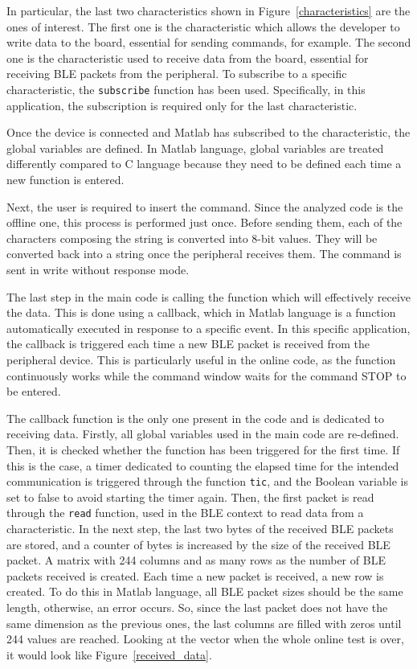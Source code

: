 \documentclass{Configuration_Files/PoliMi3i_thesis}
\begin{document}
In particular, the last two characteristics shown in Figure~\ref{characteristics} are the ones of interest. The first one is the characteristic which allows the developer to write data to the board, essential for sending commands, for example. The second one is the characteristic used to receive data from the board, essential for receiving BLE packets from the peripheral. To subscribe to a specific characteristic, the \texttt{subscribe} function has been used. Specifically, in this application, the subscription is required only for the last characteristic.

Once the device is connected and Matlab has subscribed to the characteristic, the global variables are defined. In Matlab language, global variables are treated differently compared to C language because they need to be defined each time a new function is entered.

Next, the user is required to insert the command. Since the analyzed code is the offline one, this process is performed just once. Before sending them, each of the characters composing the string is converted into 8-bit values. They will be converted back into a string once the peripheral receives them. The command is sent in write without response mode.

The last step in the main code is calling the function which will effectively receive the data. This is done using a callback, which in Matlab language is a function automatically executed in response to a specific event. In this specific application, the callback is triggered each time a new BLE packet is received from the peripheral device. This is particularly useful in the online code, as the function continuously works while the command window waits for the command STOP to be entered.

The callback function is the only one present in the code and is dedicated to receiving data. Firstly, all global variables used in the main code are re-defined. Then, it is checked whether the function has been triggered for the first time. If this is the case, a timer dedicated to counting the elapsed time for the intended communication is triggered through the function \texttt{tic}, and the Boolean variable is set to false to avoid starting the timer again. Then, the first packet is read through the \texttt{read} function, used in the BLE context to read data from a characteristic. In the next step, the last two bytes of the received BLE packets are stored, and a counter of bytes is increased by the size of the received BLE packet. A matrix with 244 columns and as many rows as the number of BLE packets received is created. Each time a new packet is received, a new row is created. To do this in Matlab language, all BLE packet sizes should be the same length, otherwise, an error occurs. So, since the last packet does not have the same dimension as the previous ones, the last columns are filled with zeros until 244 values are reached. Looking at the vector when the whole online test is over, it would look like Figure~\ref{received_data}.
\end{document}
